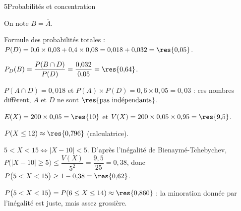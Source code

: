 

\begin{corrigeBac}{5}{Probabilités et concentration}
\begin{questions}
  \item On note $B=\overline A$.
\begin{center}
\end{center}
  \item Formule des probabilités totales : $P(D)=0{,}6\times0{,}03+0{,}4\times0{,}08=0{,}018+0{,}032=\res{0{,}05}$. 
  \item $P_D(B)=\dfrac{P(B\cap D)}{P(D)}=\dfrac{0{,}032}{0{,}05}=\res{0{,}64}$. 
  \item $P(A\cap D)=0{,}018$ et $P(A)\times P(D)=0{,}6\times0{,}05=0{,}03$ : ces nombres diffèrent, $A$ et $D$ ne sont
    $\res{\text{pas indépendants}}$. 
\end{questions}
\begin{questions}[resume]
  \item $E(X)=200\times0{,}05=\res{10}$ et $V(X)=200\times0{,}05\times0{,}95=\res{9{,}5}$. 
  \item $P(X\leq12)\approx\res{0{,}796}$ (calculatrice). 
  \item $5<X<15\iff|X-10|<5$. D'après l'inégalité de Bienaymé-Tchebychev,
    $P\big(|X-10|\geq5\big)\leq\dfrac{V(X)}{5^{2}}=\dfrac{9{,}5}{25}=0{,}38$, donc $P\big(5<X<15\big)\geq1-0{,}38=\res{0{,}62}$. 
  \item $P\big(5<X<15\big)=P(6\leq X\leq14)\approx\res{0{,}860}$ : la minoration donnée par l'inégalité est juste, mais assez grossière. 
\end{questions}
\end{corrigeBac}

